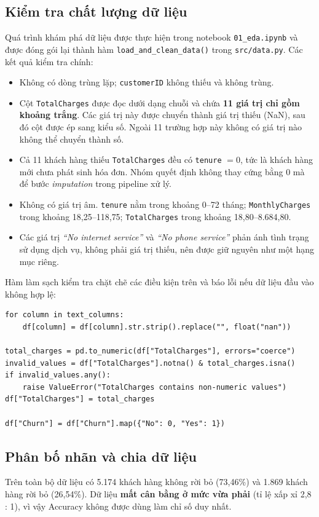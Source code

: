 \subsection{Kiểm tra chất lượng dữ liệu}
Quá trình khám phá dữ liệu được thực hiện trong notebook \texttt{01\_eda.ipynb} và được đóng gói lại thành hàm \texttt{load\_and\_clean\_data()} trong \texttt{src/data.py}. Các kết quả kiểm tra chính:
\begin{itemize}
    \item Không có dòng trùng lặp; \texttt{customerID} không thiếu và không trùng.
    \item Cột \texttt{TotalCharges} được đọc dưới dạng chuỗi và chứa \textbf{11 giá trị chỉ gồm khoảng trắng}. Các giá trị này được chuyển thành giá trị thiếu (NaN), sau đó cột được ép sang kiểu số. Ngoài 11 trường hợp này không có giá trị nào không thể chuyển thành số.
    \item Cả 11 khách hàng thiếu \texttt{TotalCharges} đều có \texttt{tenure} $= 0$, tức là khách hàng mới chưa phát sinh hóa đơn. Nhóm quyết định không thay cứng bằng 0 mà để bước \textit{imputation} trong pipeline xử lý.
    \item Không có giá trị âm. \texttt{tenure} nằm trong khoảng 0--72 tháng; \texttt{MonthlyCharges} trong khoảng 18{,}25--118{,}75; \texttt{TotalCharges} trong khoảng 18{,}80--8.684{,}80.
    \item Các giá trị \textit{``No internet service''} và \textit{``No phone service''} phản ánh tình trạng sử dụng dịch vụ, không phải giá trị thiếu, nên được giữ nguyên như một hạng mục riêng.
\end{itemize}

Hàm làm sạch kiểm tra chặt chẽ các điều kiện trên và báo lỗi nếu dữ liệu đầu vào không hợp lệ:

\begin{lstlisting}[style=pythonstyle, caption={Làm sạch TotalCharges và mã hóa nhãn trong \texttt{src/data.py}}]
for column in text_columns:
    df[column] = df[column].str.strip().replace("", float("nan"))

total_charges = pd.to_numeric(df["TotalCharges"], errors="coerce")
invalid_values = df["TotalCharges"].notna() & total_charges.isna()
if invalid_values.any():
    raise ValueError("TotalCharges contains non-numeric values")
df["TotalCharges"] = total_charges

df["Churn"] = df["Churn"].map({"No": 0, "Yes": 1})
\end{lstlisting}

\subsection{Phân bố nhãn và chia dữ liệu}
Trên toàn bộ dữ liệu có 5.174 khách hàng không rời bỏ (73{,}46\%) và 1.869 khách hàng rời bỏ (26{,}54\%). Dữ liệu \textbf{mất cân bằng ở mức vừa phải} (tỉ lệ xấp xỉ 2{,}8 : 1), vì vậy Accuracy không được dùng làm chỉ số duy nhất.

